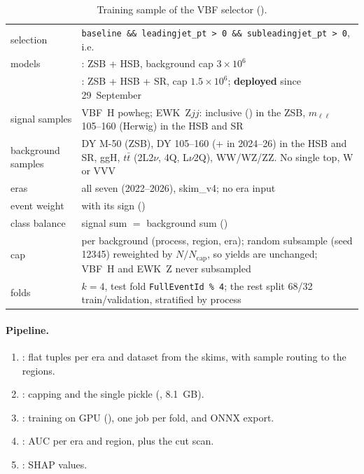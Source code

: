 \documentclass[11pt,a4paper]{article}
\newcommand{\codec}[1]{\texttt{\detokenize{#1}}}
\begin{document}
\begin{table}[H]\centering\small
\begin{tabularx}{\textwidth}{lY}
\toprule
selection & \texttt{baseline \&\& leadingjet\_pt \textgreater{} 0 \&\& subleadingjet\_pt \textgreater{} 0}, i.e.\  \\
models & : ZSB + HSB, background cap $3\times10^6$ \\
& : ZSB + HSB + SR, cap $1.5\times10^6$; \textbf{deployed} since 29~September \\
signal samples & VBF~H powheg; EWK~Z$jj$: inclusive () in the ZSB, $m_{\ell\ell}$ 105--160 (Herwig) in the HSB and SR \\
background samples & DY M-50 (ZSB), DY 105--160 (+  in 2024--26) in the HSB and SR, ggH, $t\bar t$ (2L2$\nu$, 4Q, L$\nu$2Q), WW/WZ/ZZ. No single top, W or VVV \\
eras & all seven (2022--2026), skim\_v4; no era input \\
event weight &  with its sign () \\
class balance & signal sum $=$ background sum () \\
cap & per background (process, region, era); random subsample (seed 12345) reweighted by $N/N_\text{cap}$, so yields are unchanged; VBF~H and EWK~Z never subsampled \\
folds & $k=4$, test fold \texttt{FullEventId~\%~4}; the rest split 68/32 train/validation, stratified by process \\
\bottomrule
\end{tabularx}
\caption{Training sample of the VBF selector (\codec{studies/vbf_selector/}).}
\end{table}

\paragraph{Pipeline.}
\begin{enumerate}
  \item {}: flat tuples per era and dataset from the
  skims, with sample routing to the regions.
  \item {}: capping and the single pickle
  (, 8.1~GB).
  \item {}: training on GPU (), one job per
  fold, and ONNX export.
  \item {}: AUC per era and region, plus the cut scan.
  \item {}: SHAP values.
\end{enumerate}
\end{document}
